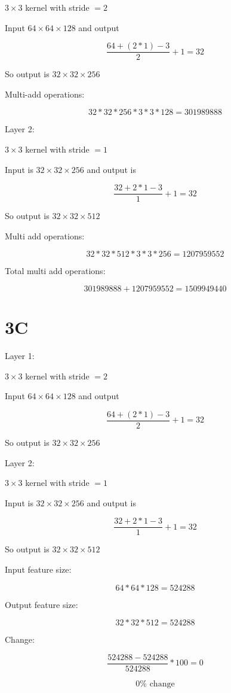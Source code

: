 \documentclass[11pt]{article}
\begin{document}
$3 \times 3$ kernel with stride $= 2$

Input $64 \times 64 \times 128$ and output

\[
\frac{64 + (2*1) - 3}{2} + 1 = 32
\]

So output is $32 \times 32 \times 256$

Multi-add operations:

\[
32 * 32 * 256 * 3 * 3 * 128 = 301989888
\]

Layer 2:

$3 \times 3$ kernel with stride $= 1$

Input is $32 \times 32 \times 256$ and output is

\[
\frac{32 + 2*1 - 3}{1} + 1 = 32
\]

So output is $32 \times 32 \times 512$

Multi add operations:

\[
32 * 32 * 512 * 3 * 3 * 256 = 1207959552
\]

Total multi add operations:

\[
301989888 + 1207959552 = 1509949440
\]

\section*{3C}

Layer 1:

$3 \times 3$ kernel with stride $= 2$

Input $64 \times 64 \times 128$ and output

\[
\frac{64 + (2*1) - 3}{2} + 1 = 32
\]

So output is $32 \times 32 \times 256$

Layer 2:

$3 \times 3$ kernel with stride $= 1$

Input is $32 \times 32 \times 256$ and output is

\[
\frac{32 + 2*1 - 3}{1} + 1 = 32
\]

So output is $32 \times 32 \times 512$

Input feature size:

\[
64 * 64 * 128 = 524288
\]

Output feature size:

\[
32 * 32 * 512 = 524288
\]

Change:

\[
\frac{524288 - 524288}{524288} * 100 = 0
\]

\[
0\% \text{ change}
\]
\end{document}
